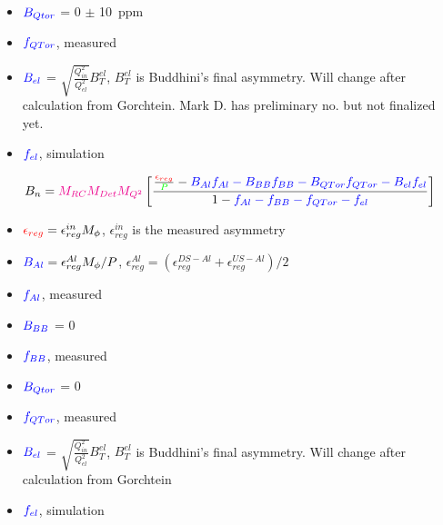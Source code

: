 \documentclass[xcolor=x11names,compress,8pt]{beamer}
\renewcommand{\(}{\begin{columns}}
\renewcommand{\)}{\end{columns}}
\newcommand{\<}[1]{\begin{column}{#1}}
\renewcommand{\>}{\end{column}}
\begin{document}
\begin{frame}
\begin{itemize}
\item 
$\textcolor{blue}{B_{Qtor}}$ = 0 $\pm$ 10~ppm
\item 
$\textcolor{blue}{f_{QTor}}$, measured

\item 
$\textcolor{blue}{B_{el}}$ = $\sqrt{\frac{Q_{in}^{2}}{Q_{el}^{2}}}B_{T}^{el}$, $B_{T}^{el}$ is Buddhini's final asymmetry. Will change after calculation from Gorchtein. Mark D. has preliminary no. but not finalized yet. 
\item 
$\textcolor{blue}{f_{el}}$, simulation


\end{itemize}

\end{frame}

\begin{frame}

\begin{equation} \label{equ:eqPhysicsAsymmetry104}
\textcolor{black}{B_{n}} = \textcolor{magenta}{M_{RC}M_{Det}M_{Q^{2}} } \left[ \frac{\frac{\textcolor{red}{\epsilon_{reg}}}{\textcolor{green}{P}} - \textcolor{blue}{ B_{Al}f_{Al} - B_{BB}f_{BB} - B_{QTor}f_{QTor} - B_{el}f_{el} } }{1 - \textcolor{blue}{ f_{Al} - f_{BB} - f_{QTor} - f_{el} }} \right] 
\end{equation}

\begin{itemize}
\item 
$\textcolor{red}{\epsilon_{reg}} = \epsilon_{reg}^{in}M_{\phi}$, $\epsilon_{reg}^{in}$ is the measured asymmetry

\item 
$\textcolor{blue}{B_{Al}} = \epsilon_{reg}^{Al}M_{\phi}/P$, 
$\epsilon_{reg}^{Al} = (\epsilon_{reg}^{DS-Al} + \epsilon_{reg}^{US-Al})/2$
\item 
$\textcolor{blue}{f_{Al}}$, measured

\item 
$\textcolor{blue}{B_{BB}}$ = 0
\item 
$\textcolor{blue}{f_{BB}}$, measured

\item 
$\textcolor{blue}{B_{Qtor}}$ = 0
\item 
$\textcolor{blue}{f_{QTor}}$, measured

\item 
$\textcolor{blue}{B_{el}}$ = $\sqrt{\frac{Q_{in}^{2}}{Q_{el}^{2}}}B_{T}^{el}$, $B_{T}^{el}$ is Buddhini's final asymmetry. Will change after calculation from Gorchtein
\item 
$\textcolor{blue}{f_{el}}$, simulation


\end{itemize}
\end{frame}
\end{document}
